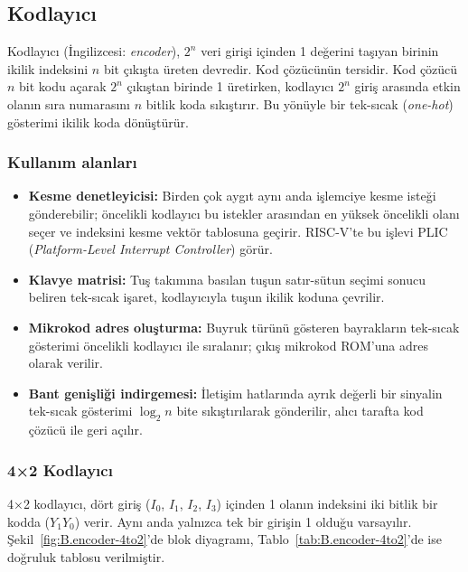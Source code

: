 \subsection{Kodlayıcı}

Kodlayıcı (İngilizcesi: \emph{encoder}), $2^n$ veri girişi içinden 1 değerini taşıyan birinin ikilik indeksini $n$ bit çıkışta üreten devredir. Kod çözücünün tersidir. Kod çözücü $n$ bit kodu açarak $2^n$ çıkıştan birinde 1 üretirken, kodlayıcı $2^n$ giriş arasında etkin olanın sıra numarasını $n$ bitlik koda sıkıştırır. Bu yönüyle bir tek-sıcak (\emph{one-hot}) gösterimi ikilik koda dönüştürür.

\subsubsection{Kullanım alanları}
\begin{itemize}[nosep]
  \item \textbf{Kesme denetleyicisi:} Birden çok aygıt aynı anda işlemciye kesme isteği gönderebilir; öncelikli kodlayıcı bu istekler arasından en yüksek öncelikli olanı seçer ve indeksini kesme vektör tablosuna geçirir. RISC-V'te bu işlevi PLIC (\emph{Platform-Level Interrupt Controller}) görür.
  \item \textbf{Klavye matrisi:} Tuş takımına basılan tuşun satır-sütun seçimi sonucu beliren tek-sıcak işaret, kodlayıcıyla tuşun ikilik koduna çevrilir.
  \item \textbf{Mikrokod adres oluşturma:} Buyruk türünü gösteren bayrakların tek-sıcak gösterimi öncelikli kodlayıcı ile sıralanır; çıkış mikrokod ROM'una adres olarak verilir.
  \item \textbf{Bant genişliği indirgemesi:} İletişim hatlarında ayrık değerli bir sinyalin tek-sıcak gösterimi $\log_2 n$ bite sıkıştırılarak gönderilir, alıcı tarafta kod çözücü ile geri açılır.
\end{itemize}

\subsubsection{4×2 Kodlayıcı}
4×2 kodlayıcı, dört giriş ($I_0$, $I_1$, $I_2$, $I_3$) içinden 1 olanın indeksini iki bitlik bir kodda ($Y_1 Y_0$) verir. Aynı anda yalnızca tek bir girişin 1 olduğu varsayılır. Şekil~\ref{fig:B.encoder-4to2}'de blok diyagramı, Tablo~\ref{tab:B.encoder-4to2}'de ise doğruluk tablosu verilmiştir.

